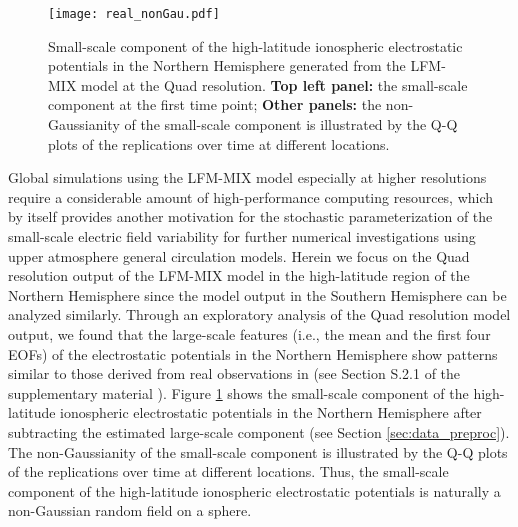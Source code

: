 \documentclass[aoas,preprint]{imsart}
\numberwithin{equation}{section}
\theoremstyle{plain}
\begin{document}
\begin{figure}[htbp] %
   \centering
   \texttt{[image: real\_nonGau.pdf]} 
   \caption{Small-scale component of the high-latitude ionospheric electrostatic potentials in the Northern Hemisphere generated from the LFM-MIX model at the Quad resolution. \textbf{Top left panel:} the small-scale component at the first time point; \textbf{Other panels:} the non-Gaussianity of the small-scale component is illustrated by the Q-Q plots of the replications over time at different locations.}
   \label{fig:real_nonGau}
\end{figure}

Global simulations using the LFM-MIX model especially at higher resolutions require a considerable amount of high-performance computing resources, which by itself provides another motivation for the stochastic parameterization of the small-scale electric field variability for further numerical investigations using upper atmosphere general circulation models. Herein we focus on the Quad resolution output of the LFM-MIX model in the high-latitude region of the Northern Hemisphere since the model output in the Southern Hemisphere can be analyzed similarly. Through an exploratory analysis of the Quad resolution model output, we found that the large-scale features (i.e., the mean and the first four EOFs) of the electrostatic potentials in the Northern Hemisphere show patterns similar to those derived from real observations in \citet{Matsuo-02, Cousins-13} (see Section S.2.1 of the supplementary material \citet{Fan-17-supp}). Figure \ref{fig:real_nonGau} shows the small-scale component of the high-latitude ionospheric electrostatic potentials in the Northern Hemisphere after subtracting the estimated large-scale component (see Section \ref{sec:data_preproc}). The non-Gaussianity of the small-scale component is illustrated by the Q-Q plots of the replications over time at different locations. Thus, the small-scale component of the high-latitude ionospheric electrostatic potentials is naturally a non-Gaussian random field on a sphere. 
 
\end{document}
